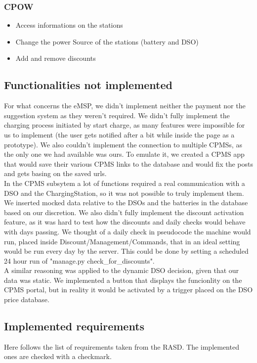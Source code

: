 \documentclass[table, 12pt]{article}
\begin{document}
\subsubsection*{CPOW}
\begin{itemize}
    \item Access informations on the stations
    \item Change the power Source of the stations (battery and DSO)
    \item Add and remove discounts
\end{itemize}

\subsection{Functionalities not implemented}
For what concerns the eMSP, we didn't implement neither the payment nor the suggestion system as they weren't required. We didn't fully implement the charging process initiated by start charge, as many 
features were impossible for us to implement (the user gets notified after a bit while inside the page as a prototype). We also couldn't implement the connection to multiple CPMSs, as the only one we had available was ours.
To emulate it, we created a CPMS app that would save their various CPMS links to the database and would fix the posts and gets basing on the saved urls. \\
In the CPMS subsytem a lot of functions required a real communication with a DSO and the ChargingStation, so it was not possible to truly implement them. We inserted mocked data relative to the DSOs and the batteries in the database based on our discretion.
We also didn't fully implement the discount activation feature, as it was hard to test how the discounts and daily checks would behave with days passing. We thought of a 
daily check in pseudocode the machine would run, placed inside Discount/Management/Commands, that in an ideal setting would be run every day by the server. This could be done by setting a scheduled 24 hour run of "manage.py check\_for\_discounts".\\
A similar reasoning was applied to the dynamic DSO decision, given that our data was static. We implemented a button that displays the funcionlity on the CPMS portal, but in reality it would be activated by a trigger
placed on the DSO price database.
\subsection{Implemented requirements}
Here follows the list of requirements taken from the RASD.
The implemented ones are checked with a checkmark.
\end{document}
